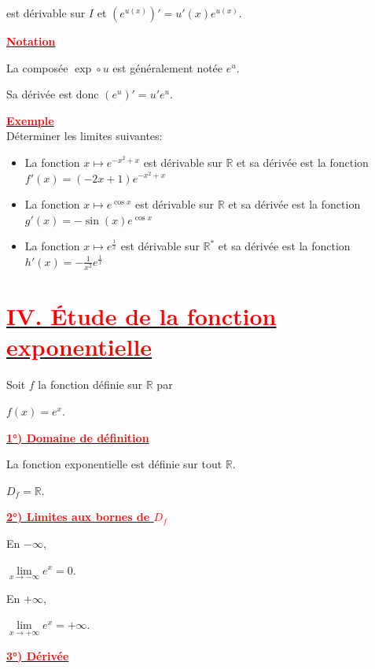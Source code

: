 \documentclass[12pt,a4paper]{article}
\begin{document}
est dérivable sur \(I\) et
\(
\left(e^{u(x)}\right)'=u'(x)e^{u(x)}.
\)

\underline{\textbf{\textcolor{red}{Notation}}}

La composée \(\exp\circ u\) est généralement notée \(e^u\).

Sa dérivée est donc
\(
(e^u)'=u'e^u.
\)

\underline{\textbf{\textcolor{red}{Exemple}}}\\
Déterminer les limites suivantes:\\
\begin{itemize}
\item[$\bullet$] La fonction $x \longmapsto e^{-x^{2}+x}$ est dérivable sur $\mathbb{R}$ et sa dérivée est la fonction \( \boxed{f'(x)=(-2x+1)e^{-x^2+x}} \) \\
\item[$\bullet$] La fonction $x \longmapsto e^{\cos x}$ est dérivable sur $\mathbb{R}$ et sa dérivée est  la fonction \( \boxed{g'(x)=-\sin(x)e^{\cos x}} \)\\
\item[$\bullet$] La fonction $x \longmapsto e^{\frac{1}{x}}$ est dérivable sur $\mathbb{R}^{*}$ et sa dérivée est  la fonction \( \boxed{h'(x)=-\frac1{x^2}e^{\frac1x}} \)\\
\end{itemize}



\section*{\underline{\textbf{\textcolor{red}{IV. Étude de la fonction exponentielle}}}}
Soit \(f\) la fonction définie sur \(\mathbb{R}\) par

\(
f(x)=e^x.
\)

\underline{\textbf{\textcolor{red}{1°) Domaine de définition}}}

La fonction exponentielle est définie sur tout \(\mathbb{R}\).

\(
D_f=\mathbb{R}.
\)

\underline{\textbf{\textcolor{red}{2°) Limites aux bornes de \(D_f\)}}}

En \(-\infty\),

\(
\lim\limits_{x\to-\infty}e^x=0.
\)

En \(+\infty\),

\(
\lim\limits_{x\to+\infty}e^x=+\infty.
\)

\underline{\textbf{\textcolor{red}{3°) Dérivée}}}
\end{document}
